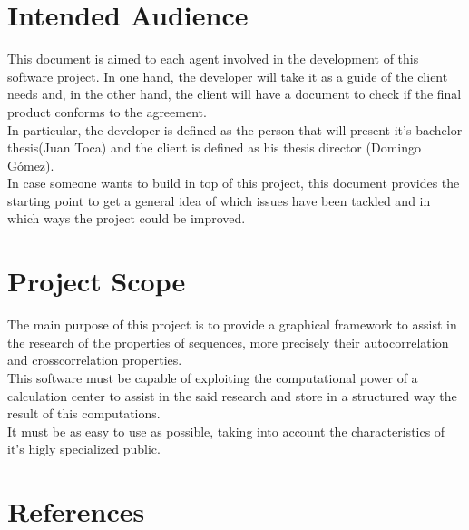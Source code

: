 \documentclass{scrreprt}
\begin{document}
\section{Intended Audience}

This document is aimed to each agent involved in the development of this
software project. In one hand, the developer will take it as a guide of the
client needs and, in the other hand, the client will have a document to
check if the final product conforms to the agreement.\\

In particular, the developer is defined as the person that will present it's
bachelor thesis(Juan Toca) and the client is defined as his thesis director
(Domingo Gómez).\\

In case someone wants to build in top of this project, this document provides
the starting point to get a general idea of which issues have been tackled and
in which ways the project could be improved.\\



\section{Project Scope}

The main purpose of this project is to provide a graphical framework to assist
in the research of the properties of sequences, more precisely their
autocorrelation and crosscorrelation properties.\\

This software must be capable of exploiting the computational power of a
calculation center to assist in the said research and store in a structured
way the result of this computations.\\

It must be as easy to use as possible, taking into account the characteristics
of it's higly specialized public.\\


\section{References}
\end{document}
